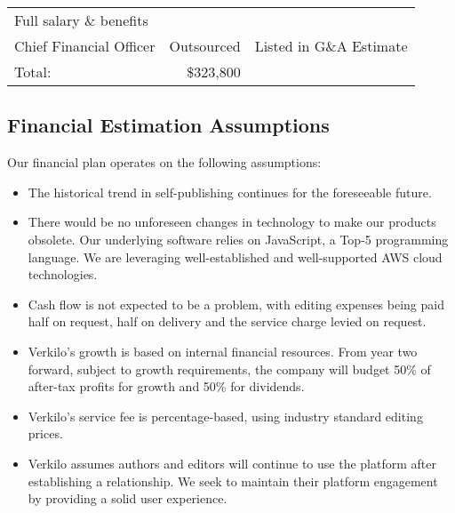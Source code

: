 \documentclass[10pt,openany]{book}
\begin{document}
\begin{longtable}[]{@{}lrl@{}}
\begin{minipage}[t]{0.32\columnwidth}
Full salary \& benefits\strut
\end{minipage}\tabularnewline
\begin{minipage}[t]{0.34\columnwidth}\raggedright
Chief Financial Officer\strut
\end{minipage} & \begin{minipage}[t]{0.16\columnwidth}\raggedleft
Outsourced\strut
\end{minipage} & \begin{minipage}[t]{0.32\columnwidth}\raggedright
Listed in G\&A Estimate\strut
\end{minipage}\tabularnewline
\begin{minipage}[t]{0.34\columnwidth}\raggedright
Total:\strut
\end{minipage} & \begin{minipage}[t]{0.16\columnwidth}\raggedleft
\$323,800\strut
\end{minipage} & \begin{minipage}[t]{0.32\columnwidth}\raggedright
\strut
\end{minipage}\tabularnewline
\bottomrule
\end{longtable}

\hypertarget{financial-estimation-assumptions}{%
\subsection{Financial Estimation
Assumptions}\label{financial-estimation-assumptions}}

Our financial plan operates on the following assumptions:

\begin{itemize}
\item
  The historical trend in self-publishing continues for the foreseeable
  future.
\item
  There would be no unforeseen changes in technology to make our
  products obsolete. Our underlying software relies on JavaScript, a
  Top-5 programming language. We are leveraging well-established and
  well-supported AWS cloud technologies.
\item
  Cash flow is not expected to be a problem, with editing expenses being
  paid half on request, half on delivery and the service charge levied
  on request.
\item
  Verkilo's growth is based on internal financial resources. From year
  two forward, subject to growth requirements, the company will budget
  50\% of after-tax profits for growth and 50\% for dividends.
\item
  Verkilo's service fee is percentage-based, using industry standard
  editing prices.
\item
  Verkilo assumes authors and editors will continue to use the platform
  after establishing a relationship. We seek to maintain their platform
  engagement by providing a solid user experience.
\end{itemize}
\end{document}
